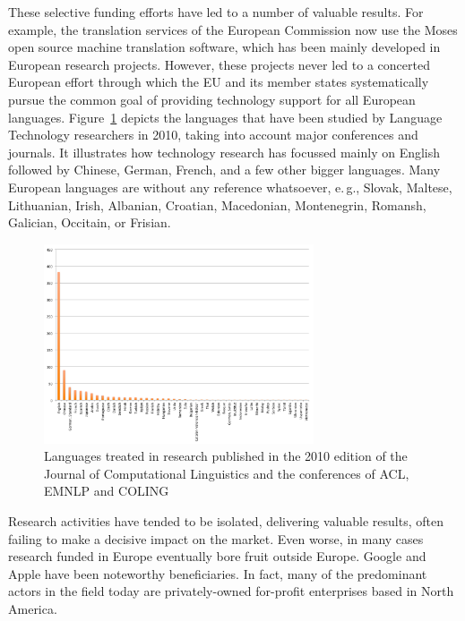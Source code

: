 \documentclass[10pt, plain]{../../metanetpaper}
\begin{document}
\begin{multicols}{2}
These selective funding efforts have led to a number of valuable results. For example, the translation services of the European Commission now use the Moses open source machine translation software, which has been mainly developed in European research projects. However, these projects never led to a concerted European effort through which the EU and its member states systematically pursue the common goal of providing technology support for all European languages. Figure~\ref{fig:languages-in-research} depicts the languages that have been studied by Language Technology researchers in 2010, taking into account major conferences and journals. It illustrates how technology research has focussed mainly on English followed by Chinese, German, French, and a few other bigger languages. Many European languages are without any reference whatsoever, e.\,g., Slovak, Maltese, Lithuanian, Irish, Albanian, Croatian, Macedonian, Montenegrin, Romansh, Galician, Occitain, or Frisian.

\begin{figure}[htb]
  \center
  \includegraphics[width=0.71\textwidth]{../_media/Languages-in-LT-Research}
  \caption{Languages treated in research published in the 2010 edition of the Journal of Computational Linguistics and the conferences of ACL, EMNLP and COLING}
  \label{fig:languages-in-research}
\end{figure}

Research activities have tended to be isolated, delivering valuable results, often failing to make a decisive impact on the market. Even worse, in many cases research funded in Europe eventually bore fruit outside Europe. Google and Apple have been noteworthy beneficiaries. In fact, many of the predominant actors in the field today are privately-owned for-profit enterprises based in North America.


\end{multicols}
\end{document}
